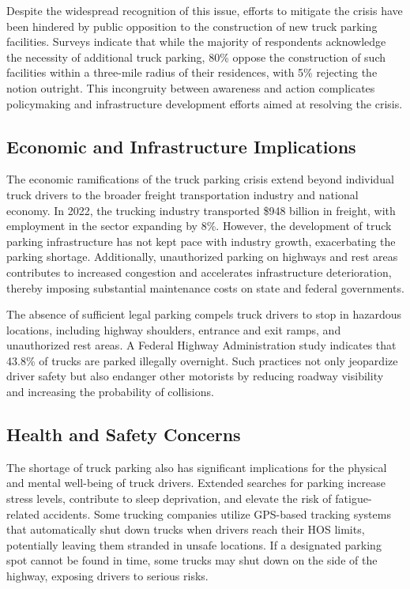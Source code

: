\documentclass[
  12pt]{article}
\begin{document}
Despite the widespread recognition of this issue, efforts to mitigate
the crisis have been hindered by public opposition to the construction
of new truck parking facilities. Surveys indicate that while the
majority of respondents acknowledge the necessity of additional truck
parking, 80\% oppose the construction of such facilities within a
three-mile radius of their residences, with 5\% rejecting the notion
outright. This incongruity between awareness and action complicates
policymaking and infrastructure development efforts aimed at resolving
the crisis.

\subsection{Economic and Infrastructure
Implications}\label{economic-and-infrastructure-implications}

The economic ramifications of the truck parking crisis extend beyond
individual truck drivers to the broader freight transportation industry
and national economy. In 2022, the trucking industry transported \$948
billion in freight, with employment in the sector expanding by 8\%.
However, the development of truck parking infrastructure has not kept
pace with industry growth, exacerbating the parking shortage.
Additionally, unauthorized parking on highways and rest areas
contributes to increased congestion and accelerates infrastructure
deterioration, thereby imposing substantial maintenance costs on state
and federal governments.

The absence of sufficient legal parking compels truck drivers to stop in
hazardous locations, including highway shoulders, entrance and exit
ramps, and unauthorized rest areas. A Federal Highway Administration
study indicates that 43.8\% of trucks are parked illegally overnight.
Such practices not only jeopardize driver safety but also endanger other
motorists by reducing roadway visibility and increasing the probability
of collisions.

\subsection{Health and Safety
Concerns}\label{health-and-safety-concerns}

The shortage of truck parking also has significant implications for the
physical and mental well-being of truck drivers. Extended searches for
parking increase stress levels, contribute to sleep deprivation, and
elevate the risk of fatigue-related accidents. Some trucking companies
utilize GPS-based tracking systems that automatically shut down trucks
when drivers reach their HOS limits, potentially leaving them stranded
in unsafe locations. If a designated parking spot cannot be found in
time, some trucks may shut down on the side of the highway, exposing
drivers to serious risks.
\end{document}
